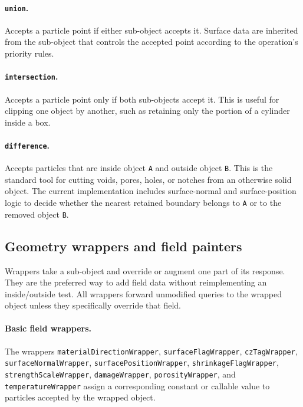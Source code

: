 \paragraph{\texttt{union}.}Accepts a particle point if either sub-object accepts it.  Surface data are inherited from the sub-object that controls the accepted point according to the operation's priority rules.

\paragraph{\texttt{intersection}.}Accepts a particle point only if both sub-objects accept it.  This is useful for clipping one object by another, such as retaining only the portion of a cylinder inside a box.

\paragraph{\texttt{difference}.}Accepts particles that are inside object \texttt{A} and outside object \texttt{B}.  This is the standard tool for cutting voids, pores, holes, or notches from an otherwise solid object.  The current implementation includes surface-normal and surface-position logic to decide whether the nearest retained boundary belongs to \texttt{A} or to the removed object \texttt{B}.

\subsection{Geometry wrappers and field painters}

Wrappers take a sub-object and override or augment one part of its response.  They are the preferred way to add field data without reimplementing an inside/outside test.  All wrappers forward unmodified queries to the wrapped object unless they specifically override that field.

\paragraph{Basic field wrappers.}The wrappers \texttt{materialDirectionWrapper}, \texttt{surfaceFlagWrapper}, \texttt{czTagWrapper}, \texttt{surfaceNormalWrapper}, \texttt{surfacePositionWrapper}, \texttt{shrinkageFlagWrapper}, \texttt{strengthScaleWrapper}, \texttt{damageWrapper}, \texttt{porosityWrapper}, and \texttt{temperatureWrapper} assign a corresponding constant or callable value to particles accepted by the wrapped object.

